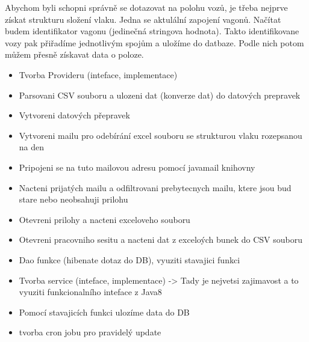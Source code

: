 Abychom byli schopni správně se dotazovat na polohu vozů, je třeba nejprve získat strukturu složení vlaku. Jedna se aktulální zapojení vagonů. Načítat budem identifikator vagonu (jedinečná stringova hodnota). Takto identifikovane vozy pak přiřadíme jednotlivým spojům a uložíme do datbaze. Podle nich potom můžem přesně získavat data o poloze.
\begin{itemize}
	\setlength{\parskip}{0pt}
	\setlength{\itemsep}{0pt}
	\item Tvorba Provideru (inteface, implementace)
	
	
	\item Parsovani CSV souboru a ulozeni dat (konverze dat) do datových prepravek
	
	
	\item Vytvoreni datových přepravek
	
	
	\item Vytvoreni mailu pro odebírání excel souboru se strukturou vlaku rozepsanou na den
	\item Pripojeni se na tuto mailovou adresu pomocí javamail knihovny
	
	
	\item Nacteni prijatých mailu a odfiltrovani prebytecnych mailu, ktere jsou bud stare nebo neobsahuji prilohu
	\item Otevreni prilohy a nacteni exceloveho souboru
	\item Otevreni pracovniho sesitu a nacteni dat z exceloých bunek do CSV souboru
	
	
	
	\item Dao funkce (hibenate dotaz do DB), vyuziti stavajici funkci
	\item Tvorba service (inteface, implementace) -> Tady je nejvetsi zajimavost a to vyuziti funkcionalního inteface z Java8
	
	
	\item Pomocí stavajicích funkci ulozíme data do DB
	\item tvorba cron jobu pro pravidelý update
	
	
\end{itemize}

